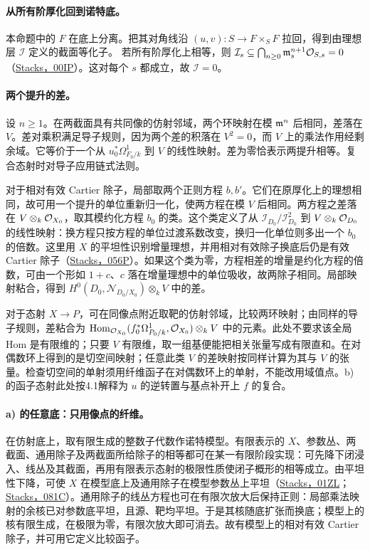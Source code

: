 \paragraph{从所有阶厚化回到诺特底。}
本命题中的 \(F\) 在底上分离。把其对角线沿 \((u,v):S\to F\times_SF\) 拉回，得到由理想层 \(\mathcal I\) 定义的截面等化子。
若所有阶厚化上相等，则 \(\mathcal I_s\subseteq\bigcap_{n\geq0}\mathfrak m_s^{n+1}\mathcal O_{S,s}=0\)（\href{https://stacks.math.columbia.edu/tag/00IP}{Stacks，00IP}）。这对每个 \(s\) 都成立，故 \(\mathcal I=0\)。

\paragraph{两个提升的差。}
设 \(n\geq1\)。在两截面具有共同像的仿射邻域，两个环映射在模 \(\mathfrak m^n\) 后相同，差落在 \(V\)。差对乘积满足导子规则，因为两个差的积落在 \(V^2=0\)，而 \(V\) 上的乘法作用经剩余域。它等价于一个从 \(u_0^*\Omega^1_{F_0/k}\) 到 \(V\) 的线性映射。差为零恰表示两提升相等。复合态射时对导子应用链式法则。

对于相对有效 Cartier 除子，局部取两个正则方程 \(b,b'\)。它们在原厚化上的理想相同，故可用一个提升的单位重新归一化，使两方程在模 \(V\) 后相同。两方程之差落在 \(V\otimes_k\mathcal O_{X_0}\)，取其模约化方程 \(b_0\) 的类。这个类定义了从 \(\mathcal I_{D_0}/\mathcal I_{D_0}^2\) 到 \(V\otimes_k\mathcal O_{D_0}\) 的线性映射：换方程只按方程的单位过渡系数改变，换归一化单位则多出一个 \(b_0\) 的倍数。这里用 \(X\) 的平坦性识别增量理想，并用相对有效除子换底后仍是有效 Cartier 除子（\href{https://stacks.math.columbia.edu/tag/056P}{Stacks，056P}）。如果这个类为零，方程相差的增量是约化方程的倍数，可由一个形如 \(1+c\)、\(c\) 落在增量理想中的单位吸收，故两除子相同。局部映射粘合，得到 \(H^0(D_0,\mathcal N_{D_0/X_0})\otimes_kV\) 中的差。

对于态射 \(X\to P\)，可在同像点附近取靶的仿射邻域，比较两环映射；由同样的导子规则，差粘合为 \(\operatorname{Hom}_{\mathcal O_{X_0}}(f_0^*\Omega^1_{P_0/k},\mathcal O_{X_0})\otimes_kV\) 中的元素。此处不要求该全局 Hom 是有限维的；只要 \(V\) 有限维，取一组基便能把相关张量写成有限直和。在对偶数环上得到的是切空间映射；任意此类 \(V\) 的差映射按同样计算为其与 \(V\) 的张量。检查切空间的单射须用纤维函子在对偶数环上的单射，不能改用域值点。b) 的函子态射此处按4.1解释为 \(u\) 的逆转置与基点补开上 \(f\) 的复合。

\paragraph{a) 的任意底：只用像点的纤维。}
在仿射底上，取有限生成的整数子代数作诺特模型。有限表示的 \(X\)、参数丛、两截面、通用除子及两截面所给除子的相等都可在某一有限阶段实现：可先降下闭浸入、线丛及其截面，再用有限表示态射的极限性质使闭子概形的相等成立。由平坦性下降，可使 \(X\) 在模型底上及通用除子在模型参数丛上平坦（\href{https://stacks.math.columbia.edu/tag/01ZL}{Stacks，01ZL}；\href{https://stacks.math.columbia.edu/tag/081C}{Stacks，081C}）。通用除子的线丛方程也可在有限次放大后保持正则：局部乘法映射的余核已对参数底平坦，且源、靶均平坦。于是其核随底扩张而换底；模型上的核有限生成，在极限为零，有限次放大即可消去。故有模型上的相对有效 Cartier 除子，并可用它定义比较函子。

